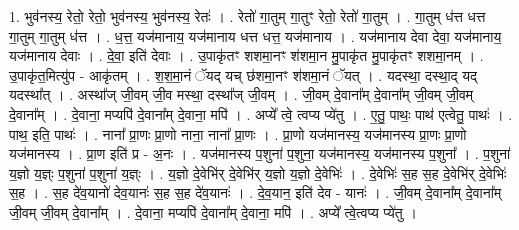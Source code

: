 \documentclass[17pt]{extarticle}
\begin{document}
1. भुव॑नस्य॒ रेतो॒ रेतो॒ भुव॑नस्य॒ भुव॑नस्य॒ रेतः॑ । . रेतो॑ गा॒तुम् गा॒तुꣳ रेतो॒ रेतो॑ गा॒तुम् । . गा॒तुम् ध॑त्त धत्त गा॒तुम् गा॒तुम् ध॑त्त । . ध॒त्त॒ यज॑मानाय॒ यज॑मानाय धत्त धत्त॒ यज॑मानाय । . यज॑मानाय देवा देवा॒ यज॑मानाय॒ यज॑मानाय देवाः । . दे॒वा॒ इति॑ देवाः । . उ॒पाकृ॑तꣳ शशमा॒नꣳ श॑शमा॒न मु॒पाकृ॑त मु॒पाकृ॑तꣳ शशमा॒नम् । . उ॒पाकृ॑त॒मित्यु॑प - आकृ॑तम् । . श॒श॒मा॒नं ॅयद् यच् छ॑शमा॒नꣳ श॑शमा॒नं ॅयत् । . यदस्था॒ दस्था॒द् यद् यदस्था᳚त् । . अस्था᳚ज् जी॒वम् जी॒व मस्था॒ दस्था᳚ज् जी॒वम् । . जी॒वम् दे॒वाना᳚म् दे॒वाना᳚म् जी॒वम् जी॒वम् दे॒वाना᳚म् । . दे॒वाना॒ मप्यपि॑ दे॒वाना᳚म् दे॒वाना॒ मपि॑ । . अप्ये᳚ त्वे॒ त्वप्य प्ये॑तु । . ए॒तु॒ पाथः॒ पाथ॑ एत्वेतु॒ पाथः॑ । . पाथ॒ इति॒ पाथः॑ । . नाना᳚ प्रा॒णः प्रा॒णो नाना॒ नाना᳚ प्रा॒णः । . प्रा॒णो यज॑मानस्य॒ यज॑मानस्य प्रा॒णः प्रा॒णो यज॑मानस्य । . प्रा॒ण इति॑ प्र - अ॒नः । . यज॑मानस्य प॒शुना॑ प॒शुना॒ यज॑मानस्य॒ यज॑मानस्य प॒शुना᳚ । . प॒शुना॑ य॒ज्ञो य॒ज्ञ्ः प॒शुना॑ प॒शुना॑ य॒ज्ञ्ः । . य॒ज्ञो दे॒वेभि॑र् दे॒वेभि॑र् य॒ज्ञो य॒ज्ञो दे॒वेभिः॑ । . दे॒वेभिः॑ स॒ह स॒ह दे॒वेभि॑र् दे॒वेभिः॑ स॒ह । . स॒ह दे॑व॒यानो॑ देव॒यानः॑ स॒ह स॒ह दे॑व॒यानः॑ । . दे॒व॒यान॒ इति॑ देव - यानः॑ । . जी॒वम् दे॒वाना᳚म् दे॒वाना᳚म् जी॒वम् जी॒वम् दे॒वाना᳚म् । . दे॒वाना॒ मप्यपि॑ दे॒वाना᳚म् दे॒वाना॒ मपि॑ । . अप्ये᳚ त्वे॒त्वप्य प्ये॑तु । \newline
\end{document}
